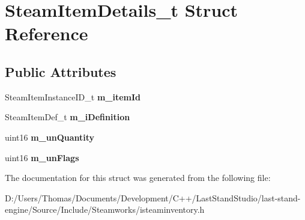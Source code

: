 \hypertarget{structSteamItemDetails__t}{}\section{Steam\+Item\+Details\+\_\+t Struct Reference}
\label{structSteamItemDetails__t}
\subsection*{Public Attributes}
\begin{DoxyCompactItemize}
\item 
\hypertarget{structSteamItemDetails__t_a45fb1296c87f566ffc43c860b123e1ed}{}Steam\+Item\+Instance\+I\+D\+\_\+t {\bfseries m\+\_\+item\+Id}\label{structSteamItemDetails__t_a45fb1296c87f566ffc43c860b123e1ed}

\item 
\hypertarget{structSteamItemDetails__t_a844fb5540dab8e45249c5c374d53b73f}{}Steam\+Item\+Def\+\_\+t {\bfseries m\+\_\+i\+Definition}\label{structSteamItemDetails__t_a844fb5540dab8e45249c5c374d53b73f}

\item 
\hypertarget{structSteamItemDetails__t_afb6f1f45fad84023d7c92fac240b7f44}{}uint16 {\bfseries m\+\_\+un\+Quantity}\label{structSteamItemDetails__t_afb6f1f45fad84023d7c92fac240b7f44}

\item 
\hypertarget{structSteamItemDetails__t_ae68d9a4365000290f8bee79546e80093}{}uint16 {\bfseries m\+\_\+un\+Flags}\label{structSteamItemDetails__t_ae68d9a4365000290f8bee79546e80093}

\end{DoxyCompactItemize}


The documentation for this struct was generated from the following file\+:\begin{DoxyCompactItemize}
\item 
D\+:/\+Users/\+Thomas/\+Documents/\+Development/\+C++/\+Last\+Stand\+Studio/last-\/stand-\/engine/\+Source/\+Include/\+Steamworks/isteaminventory.\+h\end{DoxyCompactItemize}
